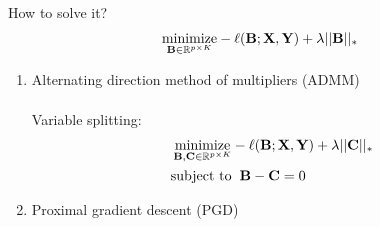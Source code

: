 \documentclass[handout]{beamer}
\def\mR{\mathbb R}\def\mS{\mathbb S}
\begin{document}
\begin{frame}{How to solve it?}
  $$
    \underset{\bB\in\mR^{p\times K}}{\mbox{minimize}}
      -\ell(\bB; \bX, \bY) + \lambda||\bB||_*
  $$
  \begin{enumerate}
    \pause
    \item Alternating direction method of multipliers (ADMM)\\
      ~\\
      Variable splitting:
      \begin{align*}
        \underset{\bB,\bC\in\mR^{p\times K}}{\mbox{minimize}} &
          -\ell(\bB; \bX, \bY) + \lambda||\bC||_*\\
        \mbox{subject to} & \hspace{2mm} \bB - \bC = 0
      \end{align*}
    \pause
    \item Proximal gradient descent (PGD)
  \end{enumerate}
\end{frame}
\end{document}
